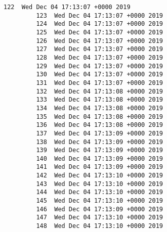 \documentclass[11pt]{article}
\begin{document}
\begin{Verbatim}[commandchars=\\\{\}]
         122  Wed Dec 04 17:13:07 +0000 2019   
         123  Wed Dec 04 17:13:07 +0000 2019   
         124  Wed Dec 04 17:13:07 +0000 2019   
         125  Wed Dec 04 17:13:07 +0000 2019   
         126  Wed Dec 04 17:13:07 +0000 2019   
         127  Wed Dec 04 17:13:07 +0000 2019   
         128  Wed Dec 04 17:13:07 +0000 2019   
         129  Wed Dec 04 17:13:07 +0000 2019   
         130  Wed Dec 04 17:13:07 +0000 2019   
         131  Wed Dec 04 17:13:07 +0000 2019   
         132  Wed Dec 04 17:13:08 +0000 2019   
         133  Wed Dec 04 17:13:08 +0000 2019   
         134  Wed Dec 04 17:13:08 +0000 2019   
         135  Wed Dec 04 17:13:08 +0000 2019   
         136  Wed Dec 04 17:13:08 +0000 2019   
         137  Wed Dec 04 17:13:09 +0000 2019   
         138  Wed Dec 04 17:13:09 +0000 2019   
         139  Wed Dec 04 17:13:09 +0000 2019   
         140  Wed Dec 04 17:13:09 +0000 2019   
         141  Wed Dec 04 17:13:09 +0000 2019   
         142  Wed Dec 04 17:13:10 +0000 2019   
         143  Wed Dec 04 17:13:10 +0000 2019   
         144  Wed Dec 04 17:13:10 +0000 2019   
         145  Wed Dec 04 17:13:10 +0000 2019   
         146  Wed Dec 04 17:13:09 +0000 2019   
         147  Wed Dec 04 17:13:10 +0000 2019   
         148  Wed Dec 04 17:13:10 +0000 2019   
         

\end{Verbatim}
\end{document}
